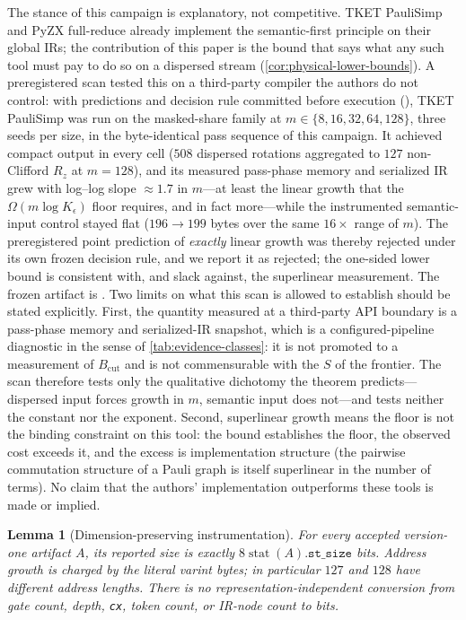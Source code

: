 \documentclass[aps,prx,reprint,floatfix,superscriptaddress]{revtex4-2}
\newtheorem{lemma}{Lemma}
\begin{document}
The stance of this campaign is explanatory, not competitive.  TKET
PauliSimp and PyZX full-reduce already implement the semantic-first
principle on their global IRs; the contribution of this paper is the
bound that says what any such tool must pay to do so on a dispersed
stream (\cref{cor:physical-lower-bounds}).  A preregistered scan tested
this on a third-party compiler the authors do not control: with
predictions and decision rule committed before execution
(), TKET PauliSimp was
run on the masked-share family at $m\in\{8,16,32,64,128\}$, three seeds
per size, in the byte-identical pass sequence of this campaign.  It
achieved compact output in every cell ($508$ dispersed rotations
aggregated to $127$ non-Clifford $R_z$ at $m=128$), and its measured
pass-phase memory and serialized IR grew with log--log slope
$\approx1.7$ in $m$---at least the linear growth that the
$\Omega(m\log K_\epsilon)$ floor requires, and in fact more---while the
instrumented semantic-input control stayed flat ($196\to199$ bytes over
the same $16\times$ range of $m$).  The preregistered point prediction
of \emph{exactly} linear growth was thereby rejected under its own
frozen decision rule, and we report it as rejected; the one-sided lower
bound is consistent with, and slack against, the superlinear
measurement.  The frozen artifact is
.  Two limits on what this
scan is allowed to establish should be stated explicitly.  First, the
quantity measured at a third-party API boundary is a pass-phase memory
and serialized-IR snapshot, which is a configured-pipeline diagnostic in
the sense of \cref{tab:evidence-classes}: it is not promoted to a
measurement of $B_{\mathrm{cut}}$ and is not commensurable with the $S$
of the frontier.  The scan therefore tests only the qualitative
dichotomy the theorem predicts---dispersed input forces growth in $m$,
semantic input does not---and tests neither the constant nor the
exponent.  Second, superlinear growth means the floor is not the binding
constraint on this tool: the bound establishes the floor, the observed
cost exceeds it, and the excess is implementation structure (the
pairwise commutation structure of a Pauli graph is itself
superlinear in the number of terms).  No claim that
the authors' implementation outperforms these tools is made or implied.

\begin{lemma}[Dimension-preserving instrumentation]
\label{lem:metric-conversion}
For every accepted version-one artifact $A$, its reported size is exactly
$8\operatorname{stat}(A).\mathtt{st\_size}$ bits.  Address growth is charged by
the literal varint bytes; in particular $127$ and $128$ have different address
lengths.  There is no representation-independent conversion from gate count,
depth, \texttt{cx}, token count, or IR-node count to bits.
\end{lemma}
\end{document}
